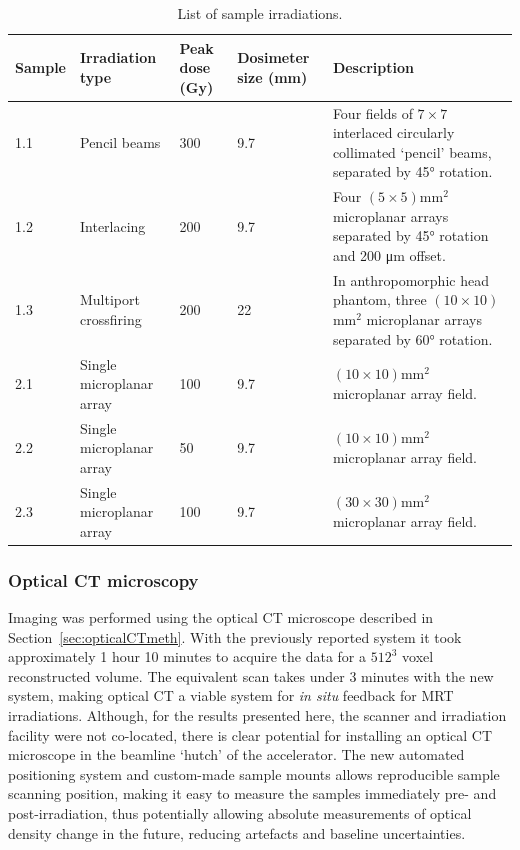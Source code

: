 	\begin{table}
		\centering
		\begin{tabular}{ p{1.3cm}  p{2.9cm} p{1cm}  p{1.8cm} p{5.5cm}  }
			\hline
			\textbf{Sample} & \textbf{Irradiation type} &\textbf{Peak dose (Gy)}   &\textbf{Dosimeter size (mm)} & \textbf{Description} \\ \hline
			1.1  & Pencil beams & 300  & 9.7 & Four fields of $7\times 7$ interlaced circularly collimated `pencil' beams, separated by  \ang{45} rotation. \\ %
			1.2  & Interlacing & 200  & 9.7 & Four $(5\times 5)$mm$^2$ microplanar arrays separated by \ang{45} rotation and 200 \si{\um} offset. \\ %
			1.3  & Multiport crossfiring & 200  & 22 & In anthropomorphic head phantom, three $(10\times 10)$mm$^2$ microplanar arrays separated by \ang{60} rotation. \\ %
			2.1  & Single microplanar array & 100  & 9.7 & $(10\times 10)$mm$^2$ microplanar array field. \\ %
			2.2  & Single microplanar array & 50  & 9.7 & $(10\times 10)$mm$^2$ microplanar array field. \\ %
			2.3  & Single microplanar array & 100  & 9.7 & $(30\times 30)$mm$^2$ microplanar array field. \\ \hline
		\end{tabular}
		\caption{List of sample irradiations.}
		\label{table:samples}
	\end{table}
	
	
	
\subsubsection{Optical CT microscopy}
	Imaging was performed using the optical CT microscope described in Section~\ref{sec:opticalCTmeth}. With the previously reported system  it took approximately 1 hour 10 minutes to acquire the data for a $512^3$ voxel reconstructed volume. \cite{doranestablishing2013} The equivalent scan takes under 3 minutes with the new system, making optical CT a viable system for \textit{in situ} feedback for MRT irradiations. Although, for the results presented here, the scanner and irradiation facility were not co-located, there is clear potential for installing an optical CT microscope in the beamline `hutch' of the accelerator. The new automated positioning system and custom-made sample mounts allows reproducible sample scanning position, making it easy to measure the samples immediately pre- and post-irradiation, thus potentially allowing absolute measurements of optical density change in the future, reducing artefacts and baseline uncertainties. 

